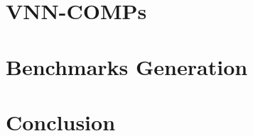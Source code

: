\documentclass[oneside,11pt,dvipsnames]{book}
\numberwithin{equation}{section}
\theoremstyle{definition}
\theoremstyle{remark}
\begin{document}
\chapter{VNN-COMPs}\label{chap:vnncomps}

\chapter{Benchmarks Generation}\label{chap:benchmarks-generation}



\chapter{Conclusion}




\renewcommand{\appendixname}{Assignment}
\appendix
\end{document}
